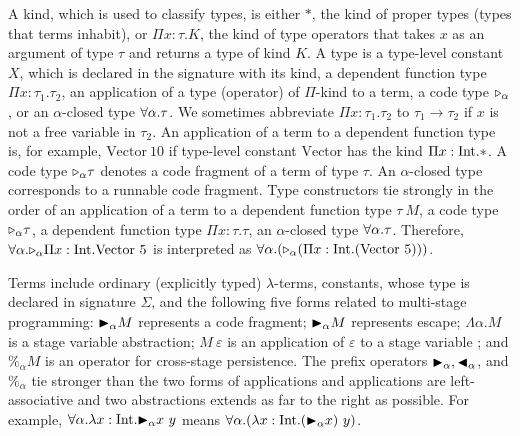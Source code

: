 


A kind, which is used to classify types, is either $*$, the kind of
proper types (types that terms inhabit), or $\Pi x\colon\tau.K$, the kind
of type operators that takes $x$ as an argument of type $\tau$ and returns a type
of kind $K$.
A type is a type-level constant $X$, which is declared in the signature with its kind, a dependent function type $\Pi x:\tau_1.\tau_2$,
an application of a type (operator) of $\Pi$-kind to a term, a code type ${\mathop{\triangleright}}_\alpha$, or an $\alpha$-closed type $\forall\alpha.\tau$.
We sometimes abbreviate $\Pi x:\tau_1.\tau_2$ to $\tau_1 \rightarrow \tau_2$ if
$x$ is not a free variable in $\tau_2$. 
An application of a term to a dependent function type  is, for example, $\text{Vector}\ 10$
if type-level constant $\text{Vector}$ has the kind $\Pi x:\textrm{Int}.*$.
A code type ${\mathop{\triangleright}}_\alpha \tau$ denotes a code fragment of a term of type $\tau$.
An $\alpha$-closed type corresponds to a runnable code fragment.
Type constructors tie strongly  in the order of 
an application of a term to a dependent function type $\tau\ M$,
a code type ${\mathop{\triangleright}}_{\alpha} \tau$,
a dependent function type $\Pi x:\tau.\tau$, 
an $\alpha$-closed type $\forall\alpha.\tau$.
Therefore, $\F\alpha.\TW_{\alpha} \Pi x:\I.\text{Vector}\ 5$ is interpreted as
$\F\alpha.(\TW_{\alpha} (\Pi x:\I.(\text{Vector}\ 5)))$. 


Terms include ordinary (explicitly typed) \(\lambda\)-terms, constants,
whose type is declared in signature $\Sigma$, and the following five forms
related to multi-stage programming:
${\mathop{\blacktriangleright}}_\alpha M$ represents a code fragment; ${\mathop{\blacktriangleright}}_\alpha M$ represents escape;
$\Lambda\alpha.M$ is a stage variable abstraction;
$M\ \varepsilon$ is an application of $\varepsilon$ to a stage variable ; and 
$\%_\alpha M$ is an operator for cross-stage persistence.
The prefix operators ${\mathop{\blacktriangleright}}_\alpha, {\mathop{\blacktriangleleft}}_\alpha$, and $\%_\alpha$ tie stronger than the two forms of applications
and applications are left-associative
and two abstractions extends as far to the right as possible.
For example, $\forall\alpha.\lambda x:\textrm{Int}.{\mathop{\blacktriangleright}}_\alpha x\ y$ means $\F\alpha.(\lambda x:\I.(\TB_\alpha x)\ y)$.

